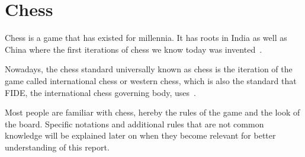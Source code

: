 \section{Chess}\label{sec:chess}

Chess is a game that has existed for millennia.
It has roots in India as well as China where the first iterations of chess we know today was invented~\cite{murray1913}.

Nowadays, the chess standard universally known as chess is the iteration of the game called international chess or
western chess, which is also the standard that FIDE, the international chess governing body, uses~\cite{fide2024}.

Most people are familiar with chess, hereby the rules of the game and the look of the board.
Specific notations and additional rules that are not common knowledge will be explained later on
when they become relevant for better understanding of this report.

